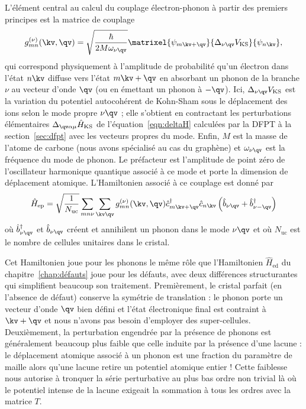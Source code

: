 L'élément central au calcul du couplage électron-phonon à partir des premiers principes est la matrice de couplage~\cite{giustinoElectronphononInteractionUsing2007}
\begin{equation}
    g_{mn}^{(\nu)}(\kv,\qv) = \sqrt{\frac{\hbar}{2M\omega_{\nu\qv}}}\matrixel{\psi_{m\kv+\qv}}{\Delta_{\nu\qv}V_\text{KS}}{\psi_{n\kv}},\label{eqn:g}
\end{equation}
qui correspond physiquement à l'amplitude de probabilité qu'un électron dans l'état $n\kv$ diffuse vers l'état $m\kv+\qv$ en absorbant un phonon de la branche $\nu$ au vecteur d'onde $\qv$ (ou en émettant un phonon à $-\qv$). Ici, $\Delta_{\nu\qv}V_\text{KS}$ est la variation du potentiel autocohérent de Kohn-Sham sous le déplacement des ions selon le mode propre $\nu\qv$ ; elle s'obtient en contractant les perturbations élémentaires $\Delta_{\qv\alpha\mu}\hat{H}_\text{KS}$ de l'équation~\eqref{eqn:deltaH} calculées par la DFPT à la section~\ref{sec:dfpt} avec les vecteurs propres du mode. Enfin, $M$ est la masse de l'atome de carbone (nous avons spécialisé au cas du graphène) et $\omega_{\nu\qv}$ est la fréquence du mode de phonon. Le préfacteur est l'amplitude de point zéro de l'oscillateur harmonique quantique associé à ce mode et porte la dimension de déplacement atomique. L'Hamiltonien associé à ce couplage est donné par~\cite{giustinoElectronphononInteractionsFirst2017,ponceEPWElectronphononCoupling2016}
\begin{equation}
    \hat{H}_\text{ep}=\sqrt{\frac{1}{N_\text{uc}}}\sum_{mn\nu}\sum_{\kv\qv}g_{mn}^{(\nu)}(\kv,\qv)\hat{c}^\dag_{m\kv+\qv}\hat{c}_{n\kv}\left(\hat{b}_{\nu\qv}+\hat{b}^\dag_{\nu-\qv}\right)\label{eqn:H_ep}
\end{equation}
où $\hat{b}^\dag_{\nu\qv}$ et $\hat{b}_{\nu\qv}$ créent et annihilent un phonon dans le mode $\nu\qv$ et où $N_\text{uc}$ est le nombre de cellules unitaires dans le cristal.

Cet Hamiltonien joue pour les phonons le même rôle que l'Hamiltonien $\hat{H}_\text{ed}$ du chapitre~\ref{chap:défauts} joue pour les défauts, avec deux différences structurantes qui simplifient beaucoup son traitement. Premièrement, le cristal parfait (en l'absence de défaut) conserve la symétrie de translation : le phonon porte un vecteur d'onde $\qv$ bien défini et l'état électronique final est contraint à $\kv+\qv$ et nous n'avons pas besoin d'employer des super-cellules. Deuxièmement, la perturbation engendrée par la présence de phonons est généralement beaucoup plus faible que celle induite par la présence d'une lacune : le déplacement atomique associé à un phonon est une fraction du paramètre de maille alors qu'une lacune retire un potentiel atomique entier ! Cette faiblesse nous autorise à tronquer la série perturbative au plus bas ordre non trivial là où le potentiel intense de la lacune exigeait la sommation à tous les ordres avec la matrice $T$.

